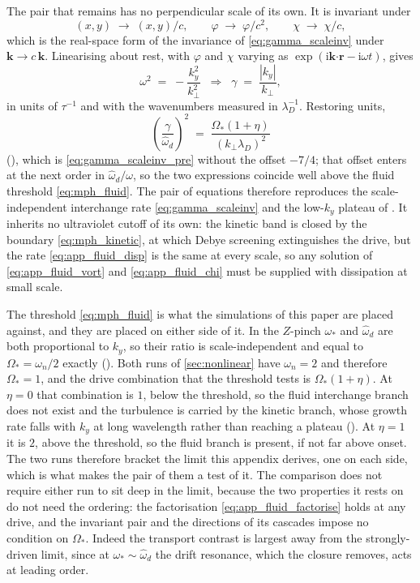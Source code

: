 \documentclass{jpp}
\renewcommand{\vec}[1]{\boldsymbol{#1}}
\newcommand{\vec}[1]{\boldsymbol{#1}}
\providecommand{\bcdot}{\vec{\cdot}}
\newcommand{\vk}{{\vec{k}}}
\newcommand{\kperp}{k_\perp}
\newcommand{\lambdaD}{\lambda_D}
\begin{document}
The pair that remains has no perpendicular scale of its own. It is invariant under
\begin{equation}\label{eq:app_fluid_rescale}
(x, y) \;\to\; (x, y)/c ,
\qquad
\varphi \;\to\; \varphi/c^2 ,
\qquad
\chi \;\to\; \chi/c ,
\end{equation}
which is the real-space form of the invariance of \cref{eq:gamma_scaleinv} under $\vk \to c\,\vk$. Linearising about rest, with $\varphi$ and $\chi$ varying as $\exp(\mathrm{i}\vk\bcdot\vec{r} - \mathrm{i}\omega t)$, gives
\begin{equation}\label{eq:app_fluid_disp}
\omega^2 \;=\; -\frac{k_y^2}{\kperp^2}
\;\;\Longrightarrow\;\;
\gamma \;=\; \frac{|k_y|}{\kperp},
\end{equation}
in units of $\tau^{-1}$ and with the wavenumbers measured in $\lambdaD^{-1}$. Restoring units,
\begin{equation}\label{eq:app_fluid_disp_dim}
\left(\frac{\gamma}{\hat\omega_d}\right)^{2} \;=\; \frac{\Omega_*(1+\eta)}{(\kperp\lambdaD)^2}
\end{equation}
(), which is \cref{eq:gamma_scaleinv_pre} without the offset $-7/4$; that offset enters at the next order in $\hat\omega_d/\omega$, so the two expressions coincide well above the fluid threshold \cref{eq:mph_fluid}. The pair of equations therefore reproduces the scale-independent interchange rate \cref{eq:gamma_scaleinv} and the low-$k_y$ plateau of . It inherits no ultraviolet cutoff of its own: the kinetic band is closed by the boundary \cref{eq:mph_kinetic}, at which Debye screening extinguishes the drive, but the rate \cref{eq:app_fluid_disp} is the same at every scale, so any solution of \cref{eq:app_fluid_vort} and \cref{eq:app_fluid_chi} must be supplied with dissipation at small scale.

The threshold \cref{eq:mph_fluid} is what the simulations of this paper are placed against, and they are placed on either side of it. In the $Z$-pinch $\omega_*$ and $\hat\omega_d$ are both proportional to $k_y$, so their ratio is scale-independent and equal to $\Omega_* = \omega_n/2$ exactly (). Both runs of \cref{sec:nonlinear} have $\omega_n = 2$ and therefore $\Omega_* = 1$, and the drive combination that the threshold tests is $\Omega_*(1+\eta)$. At $\eta = 0$ that combination is $1$, below the threshold, so the fluid interchange branch does not exist and the turbulence is carried by the kinetic branch, whose growth rate falls with $k_y$ at long wavelength rather than reaching a plateau (). At $\eta = 1$ it is $2$, above the threshold, so the fluid branch is present, if not far above onset. The two runs therefore bracket the limit this appendix derives, one on each side, which is what makes the pair of them a test of it. The comparison does not require either run to sit deep in the limit, because the two properties it rests on do not need the ordering: the factorisation \cref{eq:app_fluid_factorise} holds at any drive, and the invariant pair and the directions of its cascades impose no condition on $\Omega_*$. Indeed the transport contrast is largest away from the strongly-driven limit, since at $\omega_* \sim \hat\omega_d$ the drift resonance, which the closure removes, acts at leading order.
\end{document}
